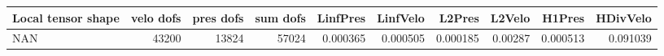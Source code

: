 \begin{tabular}{lrrrrrrrrr}
\toprule
Local tensor shape &  velo dofs &  pres dofs &  sum dofs &  LinfPres &  LinfVelo &   L2Pres &  L2Velo &   H1Pres &  HDivVelo \\
\midrule
               NAN &      43200 &      13824 &     57024 &  0.000365 &  0.000505 & 0.000185 & 0.00287 & 0.000513 &  0.091039 \\
\bottomrule
\end{tabular}
